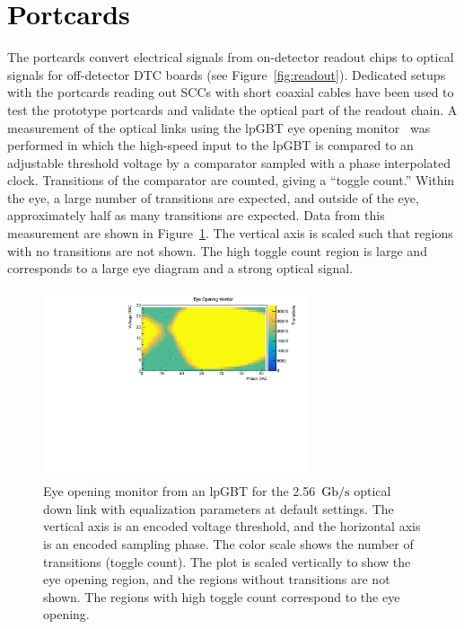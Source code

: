 \documentclass[a4paper,11pt]{article}
\newcommand{\vtrxp}{VTRx+}
\newcommand{\fig}{Figure}
\newcommand{\gbps}{\ensuremath{\mathrm{Gb}/\mathrm{s}}\xspace}
\newcommand{\black}{\textcolor{black}}
\begin{document}
\section{\black{Portcards}}
\label{sec:optical}

The portcards convert electrical signals from on-detector readout chips to optical signals for off-detector DTC boards (see \fig~\ref{fig:readout}).
Dedicated setups with the portcards reading out SCCs with short coaxial cables have been used to test the prototype portcards and validate the optical part of the readout chain.
A measurement of the optical links using the lpGBT eye opening monitor~\cite{ref:lpgbt_1} was performed in which the high-speed input to the lpGBT is compared to an adjustable threshold voltage by a comparator sampled with a phase interpolated clock.
Transitions of the comparator are counted, giving a ``toggle count.''
Within the eye, a large number of transitions are expected, and outside of the eye, approximately half as many transitions are expected.
Data from this measurement are shown in \fig~\ref{fig:lpgbt_eye}.
The vertical axis is scaled such that regions with no transitions are not shown.
The high toggle count region is large and corresponds to a large eye diagram and a strong optical signal.

%


\begin{figure}[htbp]
\centering
\includegraphics[width=0.70\textwidth,origin=c]{../figures/lpGBT_eye.pdf}
\caption{
\label{fig:lpgbt_eye}
Eye opening monitor from an lpGBT for the 2.56~\black{\gbps} optical down link with equalization parameters at default settings.
The vertical axis is an encoded voltage threshold, and the horizontal axis is an encoded sampling phase.
The color scale shows the number of transitions (toggle count).
The plot is scaled vertically to show the eye opening region, and the regions without transitions are not shown.
The regions with high toggle count correspond to the eye opening.
}
\end{figure}
\end{document}
